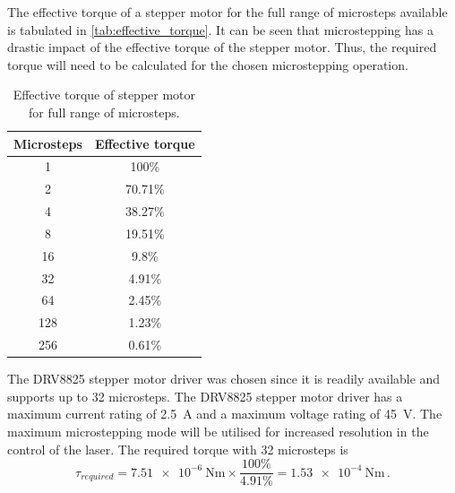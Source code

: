 The effective torque of a stepper motor for the full range of microsteps available is tabulated in \autoref{tab:effective_torque}. It can be seen that microstepping has a drastic impact of the effective torque of the stepper motor. Thus, the required torque will need to be calculated for the chosen microstepping operation.
\begin{table}[h]
    \centering
    \begin{tabular}{|c|c|}
        \hline
        Microsteps & Effective torque \\
        \hline
        1          & 100\%            \\
        2          & 70.71\%          \\
        4          & 38.27\%          \\
        8          & 19.51\%          \\
        16         & 9.8\%            \\
        32         & 4.91\%           \\
        64         & 2.45\%           \\
        128        & 1.23\%           \\
        256        & 0.61\%           \\
        \hline
    \end{tabular}
    \caption{Effective torque of stepper motor for full range of microsteps.}
    \label{tab:effective_torque}
\end{table}

The DRV8825 stepper motor driver was chosen since it is readily available and supports up to 32 microsteps. The DRV8825 stepper motor driver has a maximum current rating of 2.5~A and a maximum voltage rating of 45~V. The maximum microstepping mode will be utilised for increased resolution in the control of the laser. The required torque with 32 microsteps is
\begin{equation}
    \tau_{required} = \SI{7.51e-6}{\newton\meter} \times \frac{100\%}{4.91\%} = \SI{1.53e-4}{\newton\meter}\,.
\end{equation}

